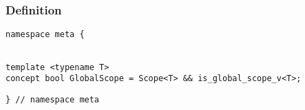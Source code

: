 
\subsubsection{Definition}

\begin{verbatim}
namespace meta {
\end{verbatim}
\begin{verbatim}

template <typename T>
concept bool GlobalScope = Scope<T> && is_global_scope_v<T>;

\end{verbatim}
\begin{verbatim}
} // namespace meta
\end{verbatim}

